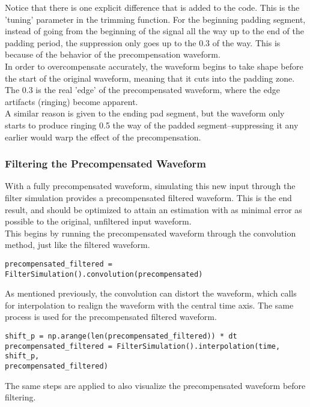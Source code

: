 \documentclass[11pt, a4paper]{article}
\theoremstyle{definition}
\numberwithin{equation}{section}
\begin{document}
Notice that there is one explicit difference that is added to the code. This is the 'tuning' parameter in the trimming function. For the beginning padding segment, instead of going from the beginning of the signal all the way up to the end of the padding period, the suppression only goes up to the 0.3 of the way. This is because of the behavior of the precompensation waveform.
\\
In order to overcompensate accurately, the waveform begins to take shape before the start of the original waveform, meaning that it cuts into the padding zone. The 0.3 is the real 'edge' of the precompensated waveform, where the edge artifacts (ringing) become apparent.
\\
A similar reason is given to the ending pad segment, but the waveform only starts to produce ringing 0.5 the way of the padded segment--suppressing it any earlier would warp the effect of the precompensation.

\subsubsection{Filtering the Precompensated Waveform}

With a fully precompensated waveform, simulating this new input through the filter simulation provides a precompensated filtered waveform. This is the end result, and should be optimized to attain an estimation with as minimal error as possible to the original, unfiltered input waveform.
\\
This begins by running the precompensated waveform through the convolution method, just like the filtered waveform.

\begin{verbatim}
precompensated_filtered = FilterSimulation().convolution(precompensated)
\end{verbatim}

As mentioned previously, the convolution can distort the waveform, which calls for interpolation to realign the waveform with the central time axis. The same process is used for the precompensated filtered waveform.
\begin{verbatim}
shift_p = np.arange(len(precompensated_filtered)) * dt
precompensated_filtered = FilterSimulation().interpolation(time, shift_p,
precompensated_filtered)
\end{verbatim}

The same steps are applied to also visualize the precompensated waveform before filtering.
\end{document}
